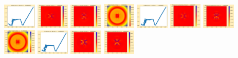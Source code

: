 \documentclass[11pt]{article}
\begin{document}
\includegraphics[width=0.11875\textwidth]{frame0002fig1.png}
\includegraphics[width=0.11875\textwidth]{frame0002fig2.png}
\includegraphics[width=0.11875\textwidth]{frame0002fig3.png}
\includegraphics[width=0.11875\textwidth]{frame0003fig0.png}
\includegraphics[width=0.11875\textwidth]{frame0003fig1.png}
\includegraphics[width=0.11875\textwidth]{frame0003fig2.png}
\includegraphics[width=0.11875\textwidth]{frame0003fig3.png}
\vskip 10pt 
\includegraphics[width=0.11875\textwidth]{frame0004fig0.png}
\includegraphics[width=0.11875\textwidth]{frame0004fig1.png}
\includegraphics[width=0.11875\textwidth]{frame0004fig2.png}
\includegraphics[width=0.11875\textwidth]{frame0004fig3.png}
\end{document}
